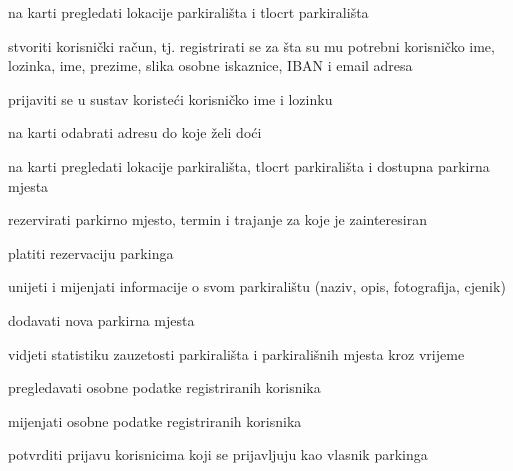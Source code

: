			
			\begin{packed_enum}
				\item  {}
				
				\begin{packed_enum}
					\item na karti pregledati lokacije parkirališta i tlocrt parkirališta
					\item stvoriti korisnički račun, tj. registrirati se za šta su mu potrebni korisničko ime, lozinka,  ime, prezime, slika osobne iskaznice, IBAN i email adresa 
				\end{packed_enum}
			
				\item  {}
				
				\begin{packed_enum}
					\item prijaviti se u sustav koristeći korisničko ime i lozinku
					\item na karti odabrati adresu do koje želi doći
					\item na karti pregledati lokacije parkirališta, tlocrt parkirališta i dostupna parkirna mjesta
					\item rezervirati parkirno mjesto, termin i trajanje za koje je zainteresiran
					\item platiti rezervaciju parkinga 
				\end{packed_enum}
				
				\item  {}
				
				\begin{packed_enum}
					\item unijeti i mijenjati informacije o svom parkiralištu (naziv, opis, fotografija, cjenik)
					\item dodavati nova parkirna mjesta
					\item vidjeti statistiku zauzetosti parkirališta i parkirališnih mjesta kroz vrijeme
			 	\end{packed_enum}
			 	
				\item  {}
				
				\begin{packed_enum}
					\item pregledavati osobne podatke registriranih korisnika
					\item mijenjati osobne podatke registriranih korisnika
					\item potvrditi prijavu korisnicima koji se prijavljuju kao vlasnik parkinga
					

\end{packed_enum}
\end{packed_enum}
